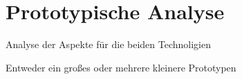 \chapter{Prototypische Analyse}


Analyse der Aspekte für die beiden Technoligien

Entweder ein großes oder mehrere kleinere Prototypen